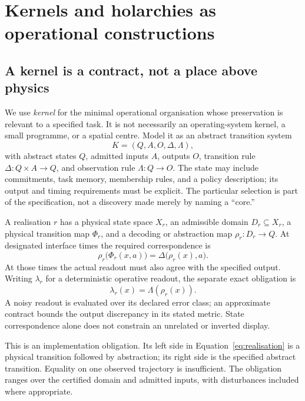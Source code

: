 \documentclass[11pt,a4paper]{article}
\theoremstyle{definition}
\theoremstyle{remark}
\newcommand{\calK}{K}
\begin{document}
\section{Kernels and holarchies as operational constructions}\label{sec:kernel}
\subsection{A kernel is a contract, not a place above physics}
We use \emph{kernel} for the minimal operational organisation whose preservation is relevant to a specified task. It is not necessarily an operating-system kernel, a small programme, or a spatial centre. Model it as an abstract transition system
\begin{equation}\label{eq:kernel}
 \calK=(Q,A,O,\Delta,\Lambda),
\end{equation}
with abstract states $Q$, admitted inputs $A$, outputs $O$, transition rule $\Delta:Q\times A\to Q$, and observation rule $\Lambda:Q\to O$. The state may include commitments, task memory, membership rules, and a policy description; its output and timing requirements must be explicit. The particular selection is part of the specification, not a discovery made merely by naming a ``core.''

A realisation $r$ has a physical state space $X_r$, an admissible domain $D_r\subseteq X_r$, a physical transition map $\Phi_r$, and a decoding or abstraction map $\rho_r:D_r\to Q$. At designated interface times the required correspondence is
\begin{equation}\label{eq:realisation}
 \rho_r\bigl(\Phi_r(x,a)\bigr)=\Delta\bigl(\rho_r(x),a\bigr).
\end{equation}
At those times the actual readout must also agree with the specified output. Writing $\lambda_r$ for a deterministic operative readout, the separate exact obligation is
\begin{equation}\label{eq:outputcorrespondence}
 \lambda_r(x)=\Lambda(\rho_r(x)).
\end{equation}
A noisy readout is evaluated over its declared error class; an approximate contract bounds the output discrepancy in its stated metric. State correspondence alone does not constrain an unrelated or inverted display.

This is an implementation obligation. Its left side in Equation~\eqref{eq:realisation} is a physical transition followed by abstraction; its right side is the specified abstract transition. Equality on one observed trajectory is insufficient. The obligation ranges over the certified domain and admitted inputs, with disturbances included where appropriate.
\end{document}
